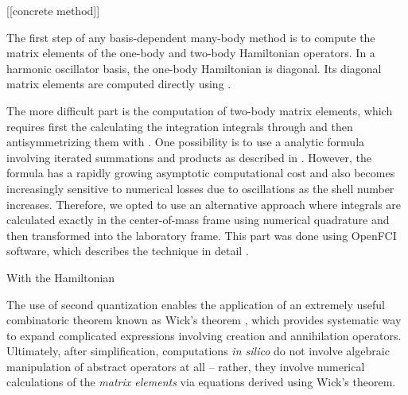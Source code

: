 


[[concrete method]]

The first step of any basis-dependent many-body method is to compute the matrix elements of the one-body and two-body Hamiltonian operators.  In a harmonic oscillator basis, the one-body Hamiltonian is diagonal.  Its diagonal matrix elements are computed directly using \label{eq:energysingleparticlestate}.

The more difficult part is the computation of two-body matrix elements, which requires first the calculating the integration integrals through \label{eq:interactionintegral} and then antisymmetrizing them with \label{eq:antisymmetricmatrixelement}.  One possibility is to use a analytic formula involving iterated summations and products as described in \cite{0953-8984-10-3-013}.  However, the formula has a rapidly growing asymptotic computational cost and also becomes increasingly sensitive to numerical losses due to oscillations as the shell number increases.  Therefore, we opted to use an alternative approach where integrals are calculated exactly in the center-of-mass frame using numerical quadrature and then transformed into the laboratory frame.  This part was done using OpenFCI software, which describes the technique in detail \cite{2008arXiv0810.2644K}.

With the Hamiltonian

The use of second quantization enables the application of an extremely useful combinatoric theorem known as Wick's theorem \cite{shavitt2009many}, which provides systematic way to expand complicated expressions involving creation and annihilation operators.  Ultimately, after simplification, computations \textit{in silico} do not involve algebraic manipulation of abstract operators at all -- rather, they involve numerical calculations of the \emph{matrix elements} via equations derived using Wick's theorem.
